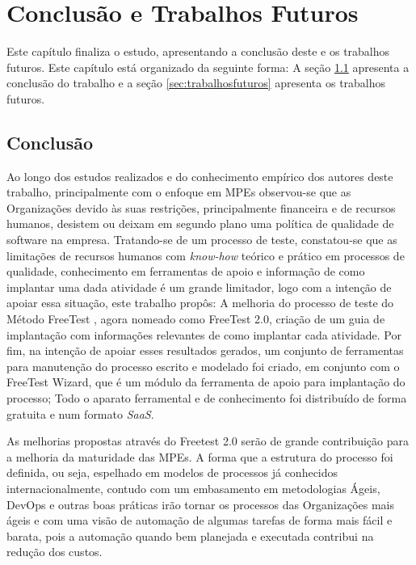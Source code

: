 \chapter{Conclusão e Trabalhos Futuros}
\label{sec:conclusaoetrabalhosfuturos}

Este capítulo finaliza o estudo, apresentando a conclusão deste e os trabalhos futuros. Este capítulo está organizado da seguinte forma: A seção \ref{sec:finalconclusao} apresenta a conclusão do trabalho e a seção \ref{sec:trabalhosfuturos} apresenta os trabalhos futuros. 

\section{Conclusão}
\label{sec:finalconclusao}

Ao longo dos estudos realizados e do conhecimento empírico dos autores deste trabalho, principalmente com o enfoque em MPEs observou-se que as Organizações devido às suas restrições, principalmente financeira e de recursos humanos, desistem ou deixam em segundo plano uma política de qualidade de software na empresa. Tratando-se de um processo de teste, constatou-se que as limitações de recursos humanos com \textit{know-how} teórico e prático em processos de qualidade, conhecimento em ferramentas de apoio e informação de como implantar uma dada atividade é um grande limitador, logo com a intenção de apoiar essa situação, este trabalho propôs: A melhoria do processo de teste do Método FreeTest \cite{Camilo-junior2012}, agora nomeado como FreeTest 2.0, criação de um guia de implantação com informações relevantes de como implantar cada atividade. Por fim, na intenção de apoiar esses resultados gerados, um conjunto de ferramentas para manutenção do processo escrito e modelado foi criado, em conjunto com o FreeTest Wizard, que é um módulo da ferramenta de apoio para implantação do processo; Todo o aparato ferramental e de conhecimento foi distribuído de forma gratuita e num formato \textit{SaaS}.

As melhorias propostas através do Freetest 2.0 serão de grande contribuição para a melhoria da maturidade das MPEs. A forma que a estrutura do processo foi definida, ou seja, espelhado em modelos de processos já conhecidos internacionalmente, contudo com um embasamento em metodologias Ágeis, DevOps e outras boas práticas irão tornar os processos das Organizações mais ágeis e com uma visão de automação de algumas tarefas de forma mais fácil e barata, pois a automação quando bem planejada e executada contribui na redução dos custos. 

